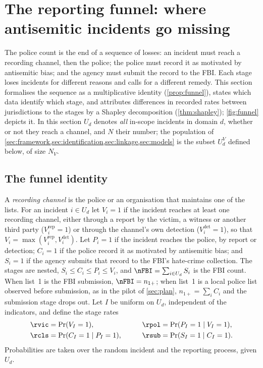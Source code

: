 \section{The reporting funnel: where antisemitic incidents go missing}\label{sec:funnel}

The police count is the end of a sequence of losses: an incident must reach a recording channel, then the police; the police must record it as motivated by antisemitic bias; and the agency must submit the record to the FBI. Each stage loses incidents for different reasons and calls for a different remedy. This section formalises the sequence as a multiplicative identity (\cref{prop:funnel}), states which data identify which stage, and attributes differences in recorded rates between jurisdictions to the stages by a Shapley decomposition (\cref{thm:shapley}); \cref{fig:funnel} depicts it. In this section $U_d$ denotes \emph{all} in-scope incidents in domain $d$, whether or not they reach a channel, and $N$ their number; the population of \cref{sec:framework,sec:identification,sec:linkage,sec:models} is the subset $U_d^V$ defined below, of size $N_V$.

\subsection{The funnel identity}\label{sec:funnel-identity}

\begin{definition}\label{def:funnel}
A \emph{recording channel} is the police or an organisation that maintains one of the lists. For an incident $i\in U_d$ let $V_i=1$ if the incident reaches at least one recording channel, either through a report by the victim, a witness or another third party ($V_i^{\mathrm{rep}}=1$) or through the channel's own detection ($V_i^{\mathrm{det}}=1$), so that $V_i=\max(V_i^{\mathrm{rep}},V_i^{\mathrm{det}})$. Let $P_i=1$ if the incident reaches the police, by report or detection; $C_i=1$ if the police record it as motivated by antisemitic bias; and $S_i=1$ if the agency submits that record to the FBI's hate-crime collection. The stages are nested, $S_i\le C_i\le P_i\le V_i$, and $\nFBI=\sum_{i\in U_d}S_i$ is the FBI count. When list~1 is the FBI submission, $\nFBI=n_{1+}$; when list~1 is a local police list observed before submission, as in the pilot of \cref{sec:plan}, $n_{1+}=\sum_iC_i$ and the submission stage drops out. Let $I$ be uniform on $U_d$, independent of the indicators, and define the stage rates
\[
\begin{aligned}
  \rvic&=\Pr(V_I=1), &\qquad \rpol&=\Pr(P_I=1\mid V_I=1),\\
  \rcls&=\Pr(C_I=1\mid P_I=1), &\qquad \rsub&=\Pr(S_I=1\mid C_I=1).
\end{aligned}
\]
Probabilities are taken over the random incident and the reporting process, given $U_d$.
\end{definition}

